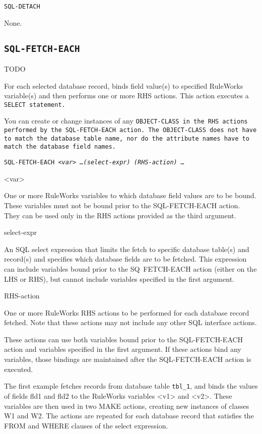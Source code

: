 {{\tt{SQL-DETACH}

\Arguments

None.

\subsection{\tt{SQL-FETCH-EACH}}
TODO

For each selected database record, binds field value(s) to specified
RuleWorks variable(s) and then performs one or more RHS actions. This
action executes a \tt{SELECT} statement.

You can create or change instances of any \tt{OBJECT-CLASS} in the RHS
actions performed by the \tt{SQL-FETCH-EACH} action. The
\tt{OBJECT-CLASS} does not have to match the database table name, nor
do the attribute names have to match the database field names.

\Format

\tt{SQL-FETCH-EACH} \verb|<|\it{var}\verb|>| \ldots \verb|(|\tt{select-expr}\verb|)| \verb|(|\it{RHS-action}\verb|)| \ldots

<var>

One or more RuleWorks variables to which database field
values are to be bound. These variables must not be bound
prior to the SQL-FETCH-EACH action. They can be used only in
the RHS actions provided as the third argument.

select-expr

An SQL select expression that limits the fetch to specific
database table(s) and record(s) and specifies which database
fields are to be fetched. This expression can include
variables bound prior to the SQ~FETCH-EACH action (either on
the LHS or RHS), but cannot include variables specified in
the first argument.

RHS-action

One or more RuleWorks RHS actions to be performed for each
database record fetched. Note that these actions may not
include any other SQL interface actions.

These actions can use both variables bound prior to the
SQL-FETCH-EACH action and variables specified in the first
argument. If these actions bind any variables, those bindings
are maintained after the SQL-FETCH-EACH action is executed.

\Example

The first example fetches records from database table \verb|tbl_1|,
and binds the values of fields fld1 and fld2 to the RuleWorks
variables <v1> and <v2>. These variables are then used in two
MAKE actions, creating new instances of classes W1 and W2.
The actions are repeated for each database record that
satisfies the FROM and WHERE clauses of the select
expression.

}}
